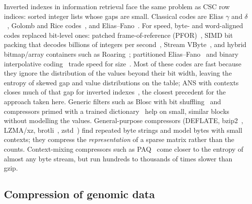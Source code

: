 Inverted indexes in information retrieval face the same problem as CSC row indices: sorted integer lists whose gaps
are small. Classical codes are Elias $\gamma$ and $\delta$~\cite{elias1975universal}, Golomb and Rice
codes~\cite{golomb1966run,rice1979some}, and Elias--Fano~\cite{elias1974efficient,vigna2013quasi}. For speed, byte- and word-aligned codes
replaced bit-level ones: patched frame-of-reference (PFOR)~\cite{zukowski2006super}, SIMD bit packing that decodes
billions of integers per second~\cite{lemire2015decoding}, Stream VByte~\cite{lemire2018stream}, and hybrid
bitmap/array containers such as Roaring~\cite{chambi2016better}; partitioned Elias--Fano~\cite{ottaviano2014partitioned}
and binary interpolative coding~\cite{moffat2000binary} trade speed for size~\cite{pibiri2021techniques}. Most of these
codes are fast because they ignore the distribution of the values beyond their bit width, leaving the entropy of skewed
gap and value distributions on the table; ANS with contexts closes much of that gap for inverted
indexes~\cite{moffat2017ans,moffat2018index,moffat2020large}, the closest precedent for the approach taken here. Generic
filters such as Blosc with bit shuffling~\cite{alted2010modern,masui2015compression,alted2023blosc2} and compressors primed
with a trained dictionary~\cite{collet2016smaller,liao2016effective} help on small, similar blocks without modelling the
values. General-purpose compressors (DEFLATE, bzip2~\cite{burrows1994block}, LZMA/xz, brotli~\cite{alakuijala2016brotli},
zstd~\cite{collet2021zstd}) find repeated byte strings and model bytes with small contexts; they compress the
\emph{representation} of a sparse matrix rather than the counts. Context-mixing compressors such as
PAQ~\cite{mahoney2005adaptive} come closer to the entropy of almost any byte stream, but run hundreds to thousands of
times slower than gzip.

\subsection{Compression of genomic data}

